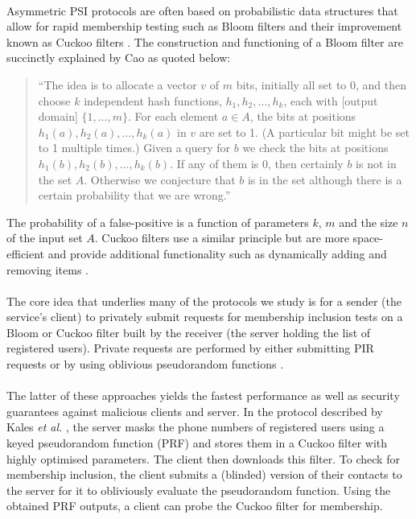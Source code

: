 \paragraph{} Asymmetric PSI protocols are often based on probabilistic data structures that allow for rapid membership testing such as Bloom filters \cite{Bloom1970} and their improvement known as Cuckoo filters \cite{Fan2014}. The construction and functioning of a Bloom filter are succinctly explained by Cao as quoted below:
\begin{quote}
	``The idea is to allocate a vector $v$ of $m$ bits, initially all set to 0, and then choose $k$ independent hash functions, $h_1, h_2, \ldots, h_k$, each with [output domain] $\{1,\ldots,m\}$. For each element $a \in A$, the bits at positions $h_1(a), h_2(a), \ldots, h_k(a)$ in $v$ are set to 1. (A particular bit might be set to 1 multiple times.) Given a query for $b$ we check the bits at positions $h_1(b), h_2(b), \ldots, h_k(b)$. If any of them is 0, then certainly $b$ is not in the set $A$. Otherwise we conjecture that $b$ is in the set although there is a certain probability that we are wrong.'' \cite{BloomCisc}
\end{quote}

\noindent The probability of a false-positive is a function of parameters $k$, $m$ and the size $n$ of the input set $A$. Cuckoo filters use a similar principle but are more space-efficient and provide additional functionality such as dynamically adding and removing items \cite{Fan2014}.


\paragraph{} The core idea that underlies many of the protocols we study \cite{Demmler2018,Kales19} is for a sender (the service's client) to privately submit requests for membership inclusion tests on a Bloom or Cuckoo filter built by the receiver (the server holding the list of registered users). Private requests are performed by either submitting PIR requests \cite{Demmler2018} or by using oblivious pseudorandom functions \cite{Kales19}.

\paragraph{} The latter of these approaches yields the fastest performance as well as security guarantees against malicious clients and server. In the protocol described by Kales \textit{et al.} \cite{Kales19}, the server masks the phone numbers of registered users using a keyed pseudorandom function (PRF) and stores them in a Cuckoo filter with highly optimised parameters. The client then downloads this filter. To check for membership inclusion, the client submits a (blinded) version of their contacts to the server for it to obliviously evaluate the pseudorandom function. Using the obtained PRF outputs, a client can probe the Cuckoo filter for membership. 

